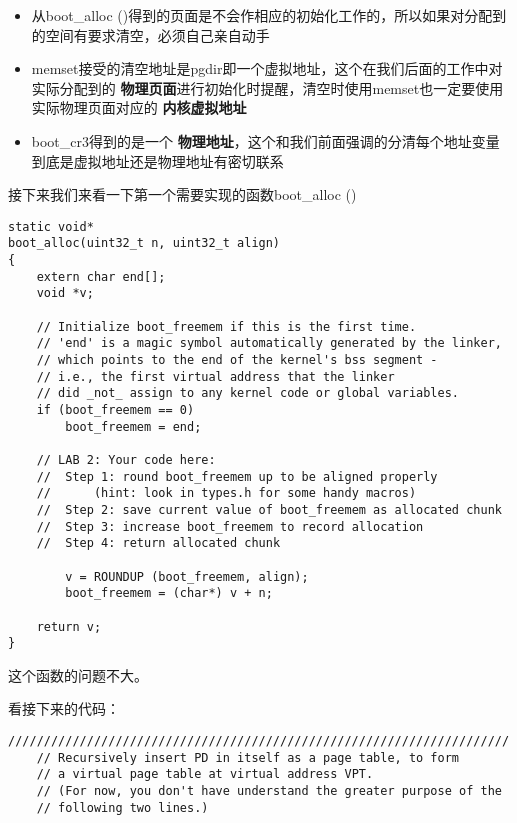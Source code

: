 \documentclass{article}
\newcommand{\highlight}[1]{{\bfseries \color{red}  #1}}
\newcommand{\funcname}[1]{{\ttfamily \small #1}}
\begin{document}
\begin{CJK*}{UTF8}{gkai}
\begin{itemize}
\item{从\funcname{boot\_alloc ()}得到的页面是不会作相应的初始化工作的，所以如果对分配到的空间有要求清空，必须自己亲自动手}
\item{\funcname{memset}接受的清空地址是pgdir即一个虚拟地址，这个在我们后面的工作中对实际分配到的\highlight{物理页面}进行初始化时提醒，清空时使用\funcname{memset}也一定要使用实际物理页面对应的\highlight{内核虚拟地址}}
\item{boot\_cr3得到的是一个\highlight{物理地址}，这个和我们前面强调的分清每个地址变量到底是虚拟地址还是物理地址有密切联系}
\end{itemize}

接下来我们来看一下第一个需要实现的函数\funcname{boot\_alloc ()}

\begin{lstlisting}[style=ccode, title={\scriptsize \ttfamily \bfseries kern/pmap.c: boot\_alloc ()}]
static void*
boot_alloc(uint32_t n, uint32_t align)
{
	extern char end[];
	void *v;

	// Initialize boot_freemem if this is the first time.
	// 'end' is a magic symbol automatically generated by the linker,
	// which points to the end of the kernel's bss segment -
	// i.e., the first virtual address that the linker
	// did _not_ assign to any kernel code or global variables.
	if (boot_freemem == 0)
		boot_freemem = end;

	// LAB 2: Your code here:
	//	Step 1: round boot_freemem up to be aligned properly
	//		(hint: look in types.h for some handy macros)
	//	Step 2: save current value of boot_freemem as allocated chunk
	//	Step 3: increase boot_freemem to record allocation
	//	Step 4: return allocated chunk

    	v = ROUNDUP (boot_freemem, align);
    	boot_freemem = (char*) v + n;
    
	return v;
}
\end{lstlisting}

这个函数的问题不大。

看接下来的代码：

\begin{lstlisting}[style=ccode, title={\scriptsize \ttfamily \bfseries kern/pmap.c: i386\_vm\_init ()}]
	//////////////////////////////////////////////////////////////////////
	// Recursively insert PD in itself as a page table, to form
	// a virtual page table at virtual address VPT.
	// (For now, you don't have understand the greater purpose of the
	// following two lines.)


\end{lstlisting}
\end{CJK*}
\end{document}
